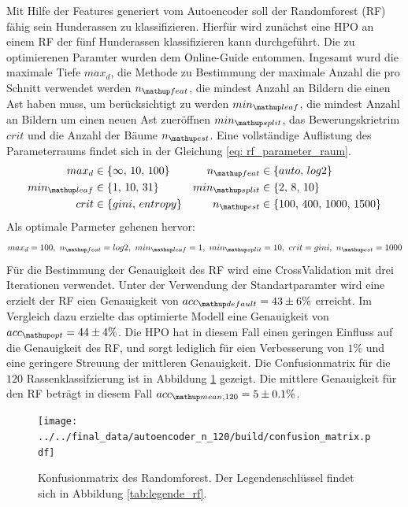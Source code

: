 Mit Hilfe der Features generiert vom Autoencoder soll der
Randomforest (RF) fähig sein Hunderassen zu klassifizieren.
Hierfür wird zunächst eine HPO an einem RF der fünf Hunderassen klassifizieren kann
durchgeführt. Die zu optimierenen Paramter
wurden dem Online-Guide \cite{RF_parameterraum} entommen. Ingesamt
wurd die maximale Tiefe $max_d$, die Methode zu Bestimmung der maximale Anzahl die pro Schnitt verwendet werden
$n\ua{feat}$, die mindest Anzahl an Bildern die einen Ast haben muss, um berücksichtigt zu werden
$min\ua{leaf}$, die mindest  Anzahl an Bildern um einen neuen Ast zueröffnen $min\ua{split}$,
das Bewerungskrietrim $crit$ und die Anzahl der Bäume $n\ua{est}$.
Eine vollständige Auflistung des Parameterraums findet sich in der Gleichung \eqref{eq: rf_parameter_raum}.
\begin{align}
  \begin{aligned}
    \label{eq: rf_parameter_raum}
    max_d &\in \left\{\infty,\, 10,\, 100\right\} & n\ua{feat}&\in\left\{auto, \,log2\right\}\\
    min\ua{leaf} &\in \left\{1,\, 10,\, 31\right\} & min\ua{split}&\in\left\{2,\, 8,\, 10\right\}\\
    crit &\in \left\{gini,\, entropy\right\} & n\ua{est}&\in\left\{100,\, 400,\, 1000,\, 1500 \right\}
  \end{aligned}
\end{align}
Als optimale Parmeter gehenen hervor:
\begin{equation*}
  max_d = 100,\,\, n\ua{feat}= log2, \,\, min\ua{leaf}= 1,\,\, min\ua{split}=10, \,\,   crit= gini, \,\, n\ua{est}=1000
\end{equation*}
Für die Bestimmung der Genauigkeit des RF wird eine CrossValidation mit
drei Iterationen verwendet. Unter der Verwendung der Standartparamter wird eine
erzielt der RF eien Genauigkeit von $acc\ua{default}=43\pm6\%$ erreicht.
Im Vergleich dazu erzielte das optimierte Modell eine Genauigkeit von $acc\ua{opt}=44\pm4\%$.
Die HPO hat in diesem Fall einen geringen Einfluss auf die Genauigkeit des RF,
und sorgt lediglich für eien Verbesserung von $1\%$ und eine geringere Streuung
der mittleren Genauigkeit.
Die Confusionmatrix für die $120$ Rassenklassifzierung ist in Abbildung
\ref{fig:Confusionmatrix_rf} gezeigt. Die mittlere Genauigkeit für den
RF beträgt in diesem Fall $acc\ua{mean,120}=5\pm0.1\%$.
\begin{figure}
\centering
\texttt{[image: ../../final\_data/autoencoder\_n\_120/build/confusion\_matrix.pdf]}
\caption{Konfusionmatrix des Randomforest. Der Legendenschlüssel findet sich in
Abbildung \ref{tab:legende_rf}.}
\label{fig:Confusionmatrix_rf}
\end{figure}
